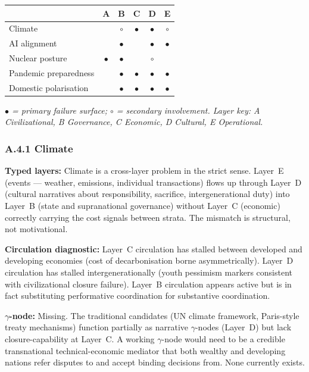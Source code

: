 \documentclass[
]{article}
\begin{document}
\begin{center}
\begin{tabular}{l|ccccc}
 & \textbf{A} & \textbf{B} & \textbf{C} & \textbf{D} & \textbf{E} \\
\hline
Climate                 &           & $\circ$    & $\bullet$  & $\bullet$  & $\circ$    \\
AI alignment            &           & $\bullet$  &            & $\bullet$  & $\bullet$  \\
Nuclear posture         & $\bullet$ & $\bullet$  &            & $\circ$    &            \\
Pandemic preparedness   &           & $\bullet$  & $\bullet$  & $\bullet$  & $\bullet$  \\
Domestic polarisation   &           & $\bullet$  & $\bullet$  & $\bullet$  & $\bullet$  \\
\end{tabular}

\smallskip
\textit{$\bullet$ = primary failure surface; $\circ$ = secondary
involvement. Layer key: A Civilizational, B Governance, C Economic,
D Cultural, E Operational.}
\end{center}

\subsubsection*{A.4.1 Climate}

\textbf{Typed layers:} Climate is a cross-layer problem in the strict
sense. Layer~E (events --- weather, emissions, individual transactions)
flows up through Layer~D (cultural narratives about responsibility,
sacrifice, intergenerational duty) into Layer~B (state and supranational
governance) without Layer~C (economic) correctly carrying the cost
signals between strata. The mismatch is structural, not motivational.

\textbf{Circulation diagnostic:} Layer~C circulation has stalled
between developed and developing economies (cost of decarbonisation
borne asymmetrically). Layer~D circulation has stalled
intergenerationally (youth pessimism markers consistent with
civilizational closure failure). Layer~B circulation appears active
but is in fact substituting performative coordination for substantive
coordination.

\textbf{\(\gamma\)-node:} Missing. The traditional candidates (UN
climate framework, Paris-style treaty mechanisms) function partially as
narrative \(\gamma\)-nodes (Layer~D) but lack closure-capability at
Layer~C. A working \(\gamma\)-node would need to be a credible
transnational technical-economic mediator that both wealthy and
developing nations refer disputes to and accept binding decisions from.
None currently exists.
\end{document}
